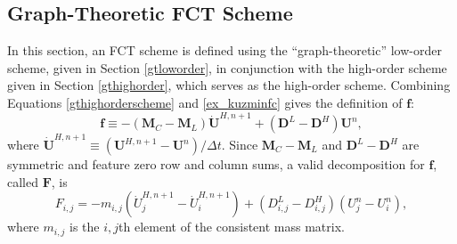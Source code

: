 \subsection{Graph-Theoretic FCT Scheme}\label{gtFCT}
In this section, an FCT scheme is defined using the ``graph-theoretic'' low-order
scheme, given in Section \ref{gtloworder}, in conjunction with the
high-order scheme given in Section \ref{gthighorder}, which serves as the
high-order scheme. Combining Equations \eqref{gthighorderscheme} and
\eqref{ex_kuzminfc} gives the definition of $\mathbf{f}$:
\begin{equation}\label{gtf}
   \mathbf{f} \equiv -(\mathbf{M}_C-\mathbf{M}_L)\mathbf{\dot{U}}^{H,n+1}
      +(\mathbf{D}^L-\mathbf{D}^H)\mathbf{U}^n,
\end{equation}
where $\mathbf{\dot{U}}^{H,n+1} \equiv (\mathbf{U}^{H,n+1} - \mathbf{U}^n)/\Delta t$.
Since $\mathbf{M}_C-\mathbf{M}_L$ and $\mathbf{D}^L-\mathbf{D}^H$ are symmetric
and feature zero row and column sums, a valid decomposition for $\mathbf{f}$,
called $\mathbf{F}$, is
\begin{equation}
   F_{i,j} = -m_{i,j}(\dot{U}^{H,n+1}_j - \dot{U}^{H,n+1}_i)
   + (D_{i,j}^L-D_{i,j}^H)(U^n_j - U^n_i),
\end{equation}
where $m_{i,j}$ is the $i,j$th element of the consistent mass matrix.
